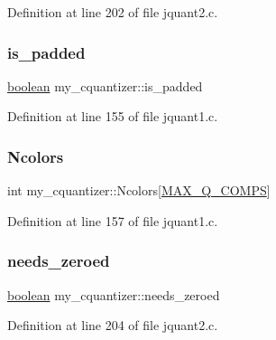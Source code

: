 Definition at line 202 of file jquant2.\+c.

\mbox{\label{structmy__cquantizer_abd8e895b22508f002cab06b54c4ee64c}} 
\subsubsection{\texorpdfstring{is\_padded}{is\_padded}}
{\footnotesize\ttfamily \mbox{\hyperlink{jmorecfg_8h_a7c6368b321bd9acd0149b030bb8275ed}{boolean}} my\+\_\+cquantizer\+::is\+\_\+padded}



Definition at line 155 of file jquant1.\+c.

\mbox{\label{structmy__cquantizer_a6b3c0905a888bd09ee2b8561ad8524c8}} 
\subsubsection{\texorpdfstring{Ncolors}{Ncolors}}
{\footnotesize\ttfamily int my\+\_\+cquantizer\+::\+Ncolors\mbox{[}\mbox{\hyperlink{jquant1_8c_aab2c575f4e3d73fa8e03c145e00459df}{M\+A\+X\+\_\+\+Q\+\_\+\+C\+O\+M\+PS}}\mbox{]}}



Definition at line 157 of file jquant1.\+c.

\mbox{\label{structmy__cquantizer_a06c9d37b470ec1e88502a32a5a73b12c}} 
\subsubsection{\texorpdfstring{needs\_zeroed}{needs\_zeroed}}
{\footnotesize\ttfamily \mbox{\hyperlink{jmorecfg_8h_a7c6368b321bd9acd0149b030bb8275ed}{boolean}} my\+\_\+cquantizer\+::needs\+\_\+zeroed}



Definition at line 204 of file jquant2.\+c.

\mbox{\label{structmy__cquantizer_aaa7e366ab4998e891762cc56f4ada754}} 
